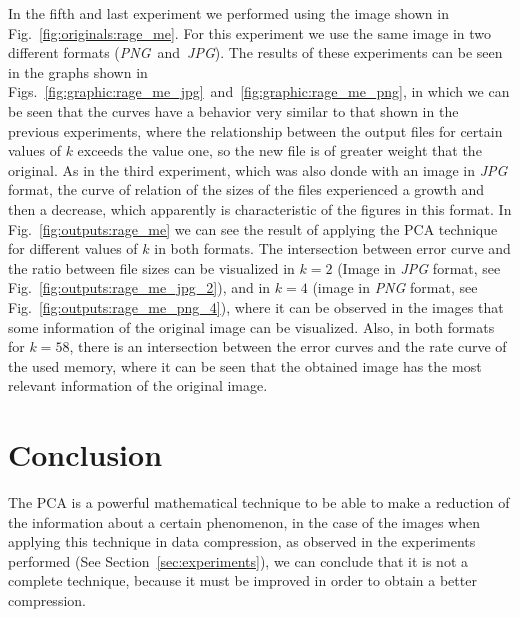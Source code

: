 \documentclass[journal]{IEEEtran}
\begin{document}
In the fifth and last experiment we performed using the image shown in Fig.~\ref{fig:originals:rage_me}. For this experiment we use the same image in two different formats (\textit{PNG}~and~\textit{JPG}).
The results of these experiments can be seen in the graphs shown in Figs.~\ref{fig:graphic:rage_me_jpg}~and~\ref{fig:graphic:rage_me_png}, in which we can be seen that the curves have a behavior very similar to that shown in the previous experiments, where the relationship between the output files for certain values of $k$ exceeds the value one, so the new file is of greater weight that the original.
As in the third experiment, which was also donde with an image in \textit{JPG} format, the curve of relation of the sizes of the files experienced a growth and then a decrease, which apparently is characteristic of the figures in this format.
In Fig.~\ref{fig:outputs:rage_me} we can see the result of applying the PCA technique for different values of $k$ in both formats. The intersection between error curve and the ratio between file sizes can be visualized in  $k=2$ (Image in \textit{JPG} format, see Fig.~\ref{fig:outputs:rage_me_jpg_2}), and in $k=4$ (image in \textit{PNG} format, see Fig.~\ref{fig:outputs:rage_me_png_4}), where it can be observed in the images that some information of the original image can be visualized. Also, in both formats for $k=58$, there is an intersection between the error curves and the rate curve of the used memory, where it can be seen that the obtained image has the most relevant information of the original image.


\section{Conclusion}

The PCA is a powerful mathematical technique to be able to make a reduction of the information about a certain phenomenon, in the case of the images when applying this technique in data compression, as observed in the experiments performed (See Section~\ref{sec:experiments}), we can conclude that it is not a complete technique, because it must be improved in order to obtain a better compression.
\end{document}
